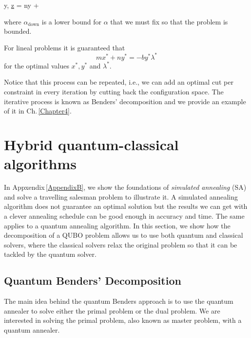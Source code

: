 \begin{tcolorbox}[colback=blue!5!white,colframe=blue!75!black,title=Master problem]
\begin{mini!}[2]
	{y, \alpha}{\underline{z} = ny + \alpha}{}{}{}
\end{mini!}
\end{tcolorbox}
where $\alpha_{\text{down}}$ is a lower bound for $\alpha$ that we must fix so that the problem is bounded.
\begin{tcolorbox}[colback=black!5!white,colframe=black!75!black,title=Strong Duality condition]
For lineal problems it is guaranteed that
\begin{equation}
    mx^{*} + ny^{*} =-by^{*}\lambda^{*}
\end{equation}
for the optimal values $x^{*},y^{*}$ and $\lambda^{*}$.
\end{tcolorbox}
 Notice that this process can be repeated, i.e., we can add an optimal cut per constraint in every iteration by cutting back the configuration space. The iterative process is known as Benders' decomposition and we provide an example of it in Ch.\,\ref{Chapter4}.

\section{Hybrid quantum-classical algorithms}
In Appxendix\,\ref{AppendixB}, we show the foundations of \textit{simulated annealing} (SA) and solve a travelling salesman problem to illustrate it. A simulated annealing algorithm does not guarantee an optimal solution but the results we can get with a clever annealing schedule can be good enough in accuracy and time. The same applies to a quantum annealing algorithm. In this section, we show how the decomposition of a QUBO problem allows us to use both quantum and classical solvers, where the classical solvers relax the original problem so that it can be tackled by the quantum solver.
\subsection{Quantum Benders' Decomposition}
The main idea behind the quantum Benders approach is to use the quantum annealer to solve either the primal problem or the dual problem. We are interested in solving the primal problem, also known as master problem, with a quantum annealer. 
